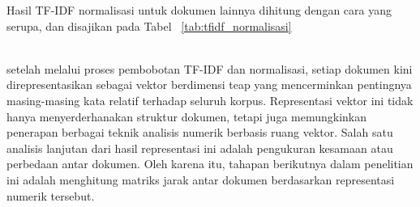 \documentclass[a4paper,12pt]{report}
\numberwithin{equation}{chapter}
\begin{document}
Hasil TF-IDF normalisasi untuk dokumen lainnya dihitung dengan cara yang serupa, dan disajikan pada Tabel ~\ref{tab:tfidf_normalisasi}
\begin{table}[h!]
\centering
\caption{Nilai Bobot Fitur per Dokumen Setelah Normalisasi}
\label{tab:tfidf_normalisasi}
\end{table} 
\\
setelah melalui proses pembobotan TF-IDF dan normalisasi, setiap dokumen kini direpresentasikan sebagai vektor berdimensi teap yang mencerminkan pentingnya masing-masing kata relatif terhadap seluruh korpus. Representasi vektor ini tidak hanya menyerderhanakan struktur dokumen, tetapi juga memungkinkan penerapan berbagai teknik analisis numerik berbasis ruang vektor. Salah satu analisis lanjutan dari hasil representasi ini adalah pengukuran kesamaan atau perbedaan antar dokumen. Oleh karena itu, tahapan berikutnya dalam penelitian ini adalah menghitung matriks jarak antar dokumen berdasarkan representasi numerik tersebut.
\end{document}
